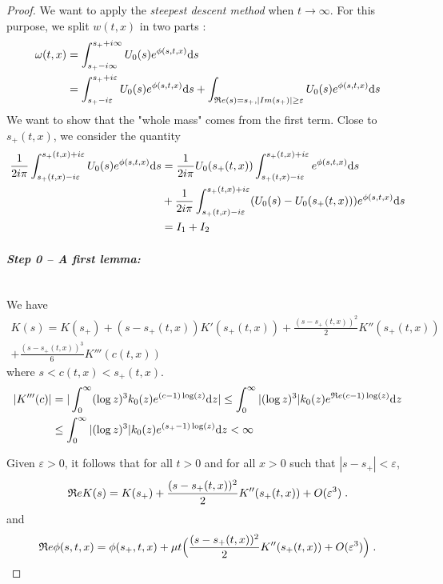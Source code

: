 \documentclass[11pt]{amsart}
\renewcommand{\Re}{\mathfrak{R}e}
\begin{document}
\begin{proof}
We want to apply the \textit{steepest descent method} when $t \to \infty$. For this purpose, we split $w(t,x)$ in two parts : 
\begin{align*}
    \omega(t,x)
        &= \int_{s_+-i\infty}^{s_++i\infty} U_0(s)e^{\phi(s, t, x)} \ds \\
        &= \int_{s_+-i\varepsilon}^{s_++i\varepsilon} U_0(s) e^{\phi(s, t, x)} \ds 
        +\int_{\Re(s) = s_+, |Im(s_+)| \geq \varepsilon} U_0(s) e^{\phi(s, t, x)} \ds \\
\end{align*}
We want to show that the "whole mass" comes from the first term. Close to $s_+(t,x)$, we consider the quantity
    \begin{align*}
    \frac{1}{2i \pi} \int_{s_+(t,x) - i\varepsilon}^{s_+(t,x) + i\varepsilon} U_0(s) e^{\phi(s,t,x)} \mathrm ds 
    &=
    \frac{1}{2i \pi} U_0(s_+(t,x)) \int_{s_+(t,x) - i\varepsilon}^{s_+(t,x) + i\varepsilon} e^{\phi(s,t,x)} \mathrm ds
    \\
    & + 
    \frac{1}{2i \pi} \int_{s_+(t,x) - i\varepsilon}^{s_+(t,x) + i\varepsilon} (U_0(s) -  U_0(s_+(t,x)))  e^{\phi(s,t,x)} \mathrm ds \\
    &= I_1 + I_2
    \end{align*}

\paragraph{\textit{Step 0 -- A first lemma:}}\mbox{}\\
We have
\begin{equation}
    \begin{split}
    K(s) = K(s_+) + (s - s_+(t,x)) K'(s_+(t,x)) + \frac{(s - s_+(t,x))^2}{2} K''(s_+(t,x)) \\+ \frac{(s - s_+(t,x))^3}{6} K'''(c(t,x))
    \end{split}
\end{equation}
where $s < c(t,x) < s_+(t,x)$.
    \begin{align*}
         |K'''(c)|
         &= |\int_0^\infty (\log z)^3 k_0(z) e^{(c-1)\log(z)}\dz|
         \leq \int_0^\infty |(\log z)^3| k_0(z)  e^{\Re (c-1)\log(z)}\dz \\
         &\leq  \int_0^\infty |(\log z)^3| k_0(z)  e^{(s_+-1)\log(z)}\dz < \infty
    \end{align*}
    
Given $\varepsilon > 0$, it follows that for all $t > 0$ and for all $x>0$ such that $|s - s_+| < \varepsilon$, 
    \begin{equation}
        \begin{split}
        \Re K(s) = K(s_+) + \frac{(s - s_+(t,x))^2}{2} K''(s_+(t,x)) + O(\varepsilon^3)
        \eqfinp
        \end{split}
    \end{equation}
and 
    \begin{equation}
        \Re \phi(s, t, x) = \phi(s_+, t, x) + \mu t \Big(\frac{(s - s_+(t,x))^2}{2} K''(s_+(t,x)) + O(\varepsilon^3)\Big)
        \eqfinp
    \end{equation}
\medskip


\end{proof}
\end{document}
